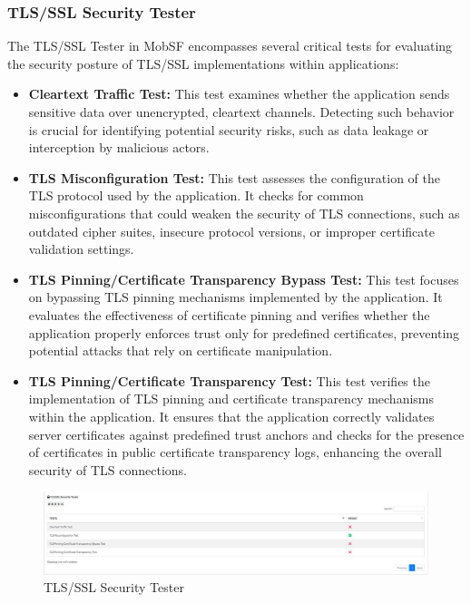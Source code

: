 \documentclass{report}
\begin{document}
\subsubsection{TLS/SSL Security Tester}
The TLS/SSL Tester in MobSF encompasses several critical tests for evaluating the security posture of TLS/SSL implementations within applications:
\begin{itemize}

\item \textbf{Cleartext Traffic Test:} This test examines whether the application sends sensitive data over unencrypted, cleartext channels. Detecting such behavior is crucial for identifying potential security risks, such as data leakage or interception by malicious actors.

\item \textbf{TLS Misconfiguration Test:} This test assesses the configuration of the TLS protocol used by the application. It checks for common misconfigurations that could weaken the security of TLS connections, such as outdated cipher suites, insecure protocol versions, or improper certificate validation settings.

\item \textbf{TLS Pinning/Certificate Transparency Bypass Test:} This test focuses on bypassing TLS pinning mechanisms implemented by the application. It evaluates the effectiveness of certificate pinning and verifies whether the application properly enforces trust only for predefined certificates, preventing potential attacks that rely on certificate manipulation.

\item \textbf{TLS Pinning/Certificate Transparency Test:} This test verifies the implementation of TLS pinning and certificate transparency mechanisms within the application. It ensures that the application correctly validates server certificates against predefined trust anchors and checks for the presence of certificates in public certificate transparency logs, enhancing the overall security of TLS connections.

\end{itemize}

\begin{figure}[hbt!]
    \centering
    \includegraphics[width=1\linewidth]{Dynamic Analyzer/tls_rep.jpg}
    \caption{TLS/SSL Security Tester}
    \label{fig:example}
\end{figure}
\FloatBarrier
\end{document}
